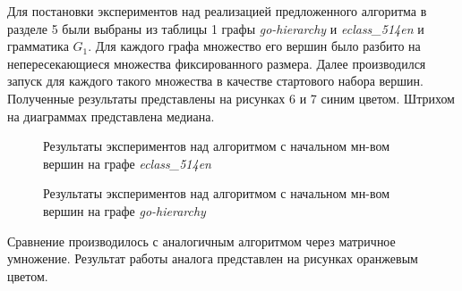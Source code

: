 Для постановки экспериментов над реализацией предложенного алгоритма в разделе 5 были выбраны из таблицы 1 графы \textit{go-hierarchy} и \textit{eclass\_514en} и грамматика $G_1$. Для каждого графа множество его вершин было разбито на непересекающиеся множества фиксированного размера. Далее производился запуск для каждого такого множества в качестве стартового набора вершин. Полученные результаты представлены на рисунках 6 и 7 синим цветом. Штрихом на диаграммах представлена медиана.

\begin{figure}[h]
\begin{minipage}[h]{0.49\linewidth}
\caption{Результаты экспериментов над алгоритмом с начальном мн-вом вершин на графе \textit{eclass\_514en}}
\end{minipage}
\hfill
\begin{minipage}[h]{0.49\linewidth}
\caption{Результаты экспериментов над алгоритмом с начальном мн-вом вершин на графе \textit{go-hierarchy}}
\end{minipage}
\end{figure}

Сравнение производилось с аналогичным алгоритмом через матричное умножение. Результат работы аналога представлен на рисунках оранжевым цветом.

